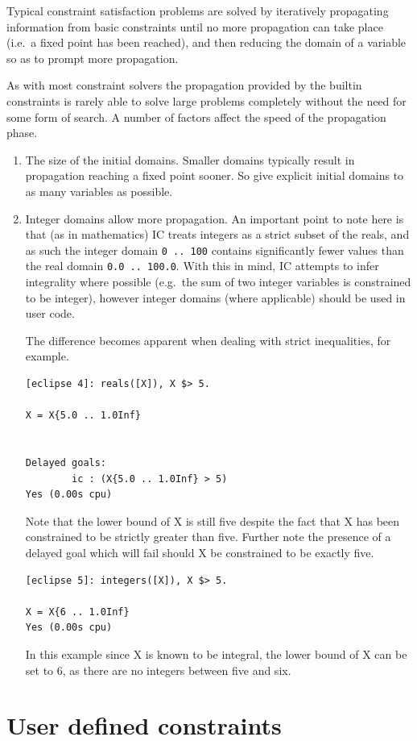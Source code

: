 Typical constraint satisfaction problems are solved by iteratively
propagating information from basic constraints until no more
propagation can take place (i.e.\ a fixed point has been reached), and
then reducing the domain of a variable so as to prompt more
propagation.

As with most constraint solvers the propagation provided by the
builtin constraints is rarely able to solve large problems completely
without the need for some form of search.  A number of factors affect
the speed of the propagation phase.

\begin{enumerate}
\item The size of the initial domains.
Smaller domains typically result in propagation reaching a fixed point
sooner.  So give explicit initial domains to as many variables as possible.
\item Integer domains allow more propagation.
An important point to note here is that (as in mathematics) IC treats
integers as a strict subset of the reals, and as such the integer
domain \verb|0 .. 100| contains significantly fewer values than the
real domain \verb|0.0 .. 100.0|.  With this in mind, IC attempts to
infer integrality where possible (e.g.\ the sum of two integer variables
is constrained to be integer), however integer domains (where
applicable) should be used in user code.

The difference becomes apparent when dealing with strict inequalities, for example.
\begin{verbatim}
[eclipse 4]: reals([X]), X $> 5.

X = X{5.0 .. 1.0Inf}


Delayed goals:
        ic : (X{5.0 .. 1.0Inf} > 5)
Yes (0.00s cpu)
\end{verbatim}
Note that the lower bound of X is still five despite the fact that X
has been constrained to be strictly greater than five.  Further note
the presence of a delayed goal which will fail should X be constrained
to be exactly five.

\begin{verbatim}
[eclipse 5]: integers([X]), X $> 5.

X = X{6 .. 1.0Inf}
Yes (0.00s cpu)
\end{verbatim}
In this example since X is known to be integral, the lower bound of X
can be set to 6, as there are no integers between five and six.
\end{enumerate}


\section{User defined constraints}

